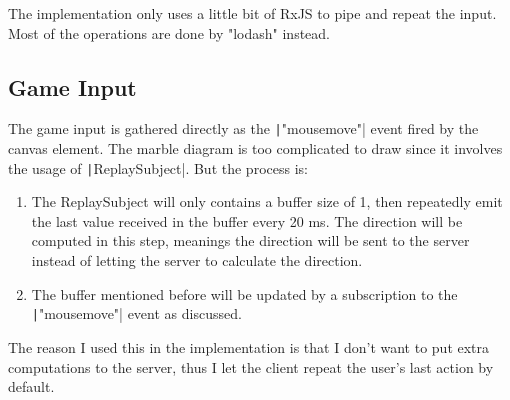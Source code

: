 \documentclass[12pt]{article}
\begin{document}
The implementation only uses a little bit of RxJS to pipe and repeat the input. Most of the operations are done by "lodash" instead.

\subsection{Game Input}

The game input is gathered directly as the \texttt|"mousemove"| event fired by the canvas element. The marble diagram is too complicated to draw since it involves the usage of \texttt|ReplaySubject|. But the process is:

\begin{enumerate}
  \item The ReplaySubject will only contains a buffer size of 1, then repeatedly emit the last value received in the buffer every 20 ms. The direction will be computed in this step, meanings the direction will be sent to the server instead of letting the server to calculate the direction.
  \item The buffer mentioned before will be updated by a subscription to the \texttt|"mousemove"| event as discussed.
\end{enumerate}

The reason I used this in the implementation is that I don't want to put extra computations to the server, thus I let the client repeat the user's last action by default.
\end{document}
